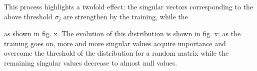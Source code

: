 \documentclass[twocolumn]{article}
\begin{document}
This process highlights a twofold effect: the singular vectors corresponding to the above threshold \(\sigma_j\) are strengthen by the training, while the

 as shown in fig. x. The evolution of this distribution is shown in fig. x; as the training goes on, more and more singular values acquire importance and overcome the threshold of the distribution for a random matrix while the remaining singular values decrease to almost null values.



\end{document}

